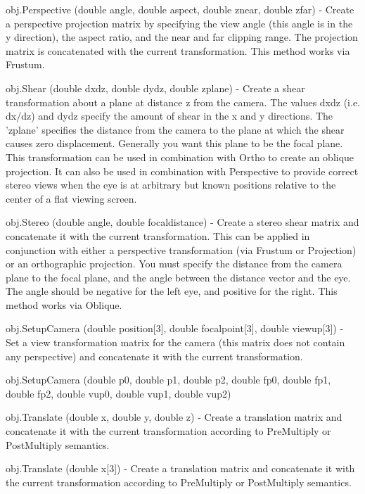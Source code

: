 \begin{DoxyItemize}
\item {\ttfamily obj.\-Perspective (double angle, double aspect, double znear, double zfar)} -\/ Create a perspective projection matrix by specifying the view angle (this angle is in the y direction), the aspect ratio, and the near and far clipping range. The projection matrix is concatenated with the current transformation. This method works via Frustum.  
\item {\ttfamily obj.\-Shear (double dxdz, double dydz, double zplane)} -\/ Create a shear transformation about a plane at distance z from the camera. The values dxdz (i.\-e. dx/dz) and dydz specify the amount of shear in the x and y directions. The 'zplane' specifies the distance from the camera to the plane at which the shear causes zero displacement. Generally you want this plane to be the focal plane. This transformation can be used in combination with Ortho to create an oblique projection. It can also be used in combination with Perspective to provide correct stereo views when the eye is at arbitrary but known positions relative to the center of a flat viewing screen.  
\item {\ttfamily obj.\-Stereo (double angle, double focaldistance)} -\/ Create a stereo shear matrix and concatenate it with the current transformation. This can be applied in conjunction with either a perspective transformation (via Frustum or Projection) or an orthographic projection. You must specify the distance from the camera plane to the focal plane, and the angle between the distance vector and the eye. The angle should be negative for the left eye, and positive for the right. This method works via Oblique.  
\item {\ttfamily obj.\-Setup\-Camera (double position\mbox{[}3\mbox{]}, double focalpoint\mbox{[}3\mbox{]}, double viewup\mbox{[}3\mbox{]})} -\/ Set a view transformation matrix for the camera (this matrix does not contain any perspective) and concatenate it with the current transformation.  
\item {\ttfamily obj.\-Setup\-Camera (double p0, double p1, double p2, double fp0, double fp1, double fp2, double vup0, double vup1, double vup2)}  
\item {\ttfamily obj.\-Translate (double x, double y, double z)} -\/ Create a translation matrix and concatenate it with the current transformation according to Pre\-Multiply or Post\-Multiply semantics.  
\item {\ttfamily obj.\-Translate (double x\mbox{[}3\mbox{]})} -\/ Create a translation matrix and concatenate it with the current transformation according to Pre\-Multiply or Post\-Multiply semantics.  

\end{DoxyItemize}
